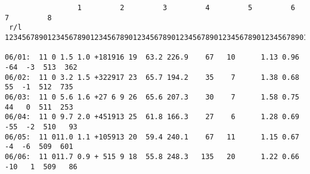 {\footnotesize \begin{verbatim}
                 1         2         3         4         5         6         7         8
 r/l    12345678901234567890123456789012345678901234567890123456789012345678901234567890

06/01:  11 0 1.5 1.0 +181916 19  63.2 226.9    67   10      1.13 0.96 -64  -3  513  362 
06/02:  11 0 3.2 1.5 +322917 23  65.7 194.2    35    7      1.38 0.68  55  -1  512  735 
06/03:  11 0 5.6 1.6 +27 6 9 26  65.6 207.3    30    7      1.58 0.75  44   0  511  253 
06/04:  11 0 9.7 2.0 +451913 25  61.8 166.3    27    6      1.28 0.69 -55  -2  510   93 
06/05:  11 011.0 1.1 +105913 20  59.4 240.1    67   11      1.15 0.67  -4  -6  509  601 
06/06:  11 011.7 0.9 + 515 9 18  55.8 248.3   135   20      1.22 0.66 -10   1  509   86 


\end{verbatim}}

